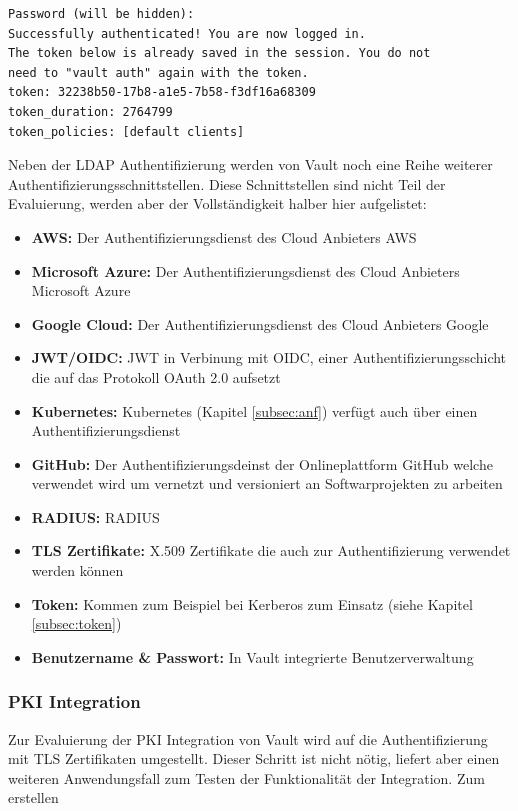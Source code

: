 \documentclass[
book,
a4paper,   
titlepage,  
halfparskip,
12pt        
]{scrartcl}
\begin{document}
\begin{onehalfspacing}
\begin{lstlisting}[caption={[\acs{LDAP} Authentifizierung] Kommandozeilenausgabe nach erfolgreicher Authentifizierung durch \acs{LDAP}}, label=lst:auth, captionpos=b, basicstyle=\ttfamily] 
Password (will be hidden):
Successfully authenticated! You are now logged in.
The token below is already saved in the session. You do not
need to "vault auth" again with the token.
token: 32238b50-17b8-a1e5-7b58-f3df16a68309
token_duration: 2764799
token_policies: [default clients]
\end{lstlisting}

Neben der LDAP Authentifizierung werden von Vault noch eine Reihe weiterer Authentifizierungsschnittstellen. Diese Schnittstellen sind nicht Teil der Evaluierung, werden aber der Vollständigkeit halber hier aufgelistet:\cite{vaultauth}
\begin{itemize}
	\item \textbf{\ac{AWS}:} Der Authentifizierungsdienst des Cloud Anbieters \ac{AWS}
	\item \textbf{Microsoft Azure:} Der Authentifizierungsdienst des Cloud Anbieters Microsoft Azure
	\item \textbf{Google Cloud:} Der Authentifizierungsdienst des Cloud Anbieters Google
	\item \textbf{\acs{JWT}/\acs{OIDC}:} \ac{JWT} in Verbinung mit \ac{OIDC}, einer Authentifizierungsschicht die auf das Protokoll OAuth 2.0 aufsetzt
	\item \textbf{Kubernetes:} Kubernetes (Kapitel \vref{subsec:anf}) verfügt auch über einen Authentifizierungsdienst
	\item \textbf{GitHub:} Der Authentifizierungsdeinst der Onlineplattform GitHub welche verwendet wird um vernetzt und versioniert an Softwarprojekten zu arbeiten
	\item \textbf{\acs{RADIUS}:} \ac{RADIUS} 
	\item \textbf{\acs{TLS} Zertifikate:} X.509 Zertifikate die auch zur Authentifizierung verwendet werden können
	\item \textbf{Token:} Kommen zum Beispiel bei Kerberos zum Einsatz (siehe Kapitel \vref{subsec:token})
	\item \textbf{Benutzername \& Passwort:} In Vault integrierte Benutzerverwaltung
\end{itemize}

\subsubsection{\acs{PKI} Integration} 
Zur Evaluierung der \ac{PKI} Integration von Vault wird auf die Authentifizierung mit \ac{TLS} Zertifikaten umgestellt. Dieser Schritt ist nicht nötig, liefert aber einen weiteren Anwendungsfall zum Testen der Funktionalität der Integration. Zum erstellen 
 


\end{onehalfspacing}
\end{document}
